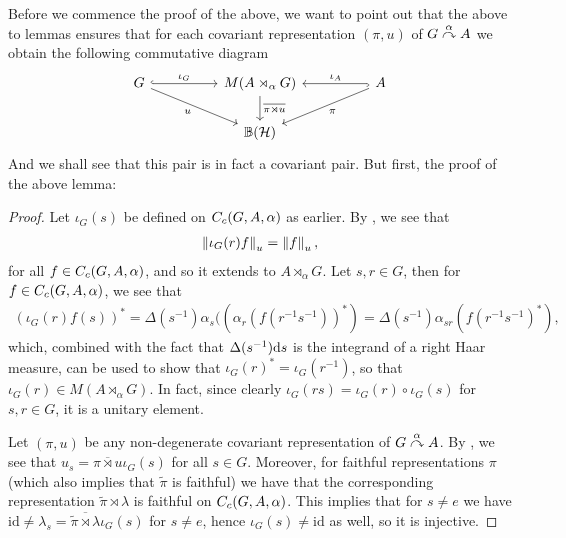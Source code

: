 Before we commence the proof of the above, we want to point out that the above to lemmas ensures that for each covariant representation $(\pi , u)$ of $G \stackrel{\alpha}{\curvearrowright} A$ we obtain the following commutative diagram
\begin{equation}
\begin{tikzcd}
	G \arrow[rr, "\iota_G", hook] \arrow[rrd, "u"'] && M(A \rtimes_\alpha G) \arrow[d, "\overline{\pi \rtimes u }"] && A \arrow[ll,"\iota_A"',hook] \arrow[lld, "\pi"]\\
	& &\mathbb{B}(\H)&&
\end{tikzcd}
\label{diag:iotacom}
\end{equation}
And we shall see that this pair is in fact a covariant pair. But first, the proof of the above lemma:
\begin{proof}
Let $\iota_G(s)$ be defined on $C_c(G,A,\alpha)$ as earlier. By , we see that
\begin{align*}
	\left\lVert \iota_G(r) f \right\rVert_u = \left\lVert f \right\rVert_u,
\end{align*}
for all $f \in C_c(G,A,\alpha)$, and so it extends to $A \rtimes_\alpha G$. Let $s,r \in G$, then for $f \in C_c(G,A,\alpha)$, we see that
\begin{align*}
	(\iota_G(r) f(s))^* = \Delta(s^{-1}) \alpha_s ( (\alpha_r(f(r^{-1}s^{-1}))^*)= \Delta(s^{-1}) \alpha_{sr}(f(r^{-1}s^{-1})^*),
\end{align*}
which, combined with the fact that $\Delta(s^{-1}) \mathrm{d} s$ is the integrand of a right Haar measure, can be used to show that $\iota_G(r)^* = \iota_G(r^{-1})$, so that $\iota_G(r) \in M(A \rtimes_\alpha G)$. In fact, since clearly $\iota_G(rs) = \iota_G(r) \circ \iota_G(s)$ for $s,r \in G$, it is a unitary element.

Let $(\pi,u)$ be any non-degenerate covariant representation of $G \stackrel{\alpha}{\curvearrowright} A$. By , we see that $u_s  = \overline{ \pi \rtimes u} \iota_G(s)$ for all $ s \in G$. Moreover, for faithful representations $\pi$ (which also implies that $\tilde \pi$ is faithful) we have that the corresponding representation $\tilde \pi \rtimes \lambda$ is faithful on $C_c(G,A,\alpha)$. This implies that for $s \neq e$ we have $\mathrm{id} \neq \lambda_s = \overline{\tilde \pi \rtimes \lambda} \iota_G(s)$ for $s \neq e$, hence $\iota_G(s) \neq \mathrm{id}$ as well, so it is injective.
	


\end{proof}
